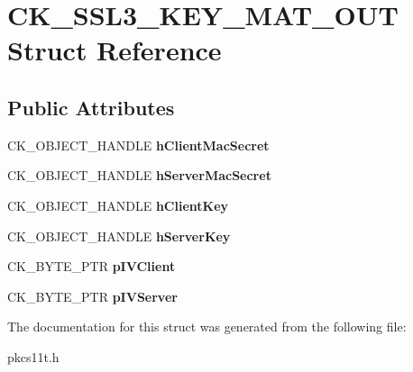 \hypertarget{struct_c_k___s_s_l3___k_e_y___m_a_t___o_u_t}{}\section{C\+K\+\_\+\+S\+S\+L3\+\_\+\+K\+E\+Y\+\_\+\+M\+A\+T\+\_\+\+O\+UT Struct Reference}
\label{struct_c_k___s_s_l3___k_e_y___m_a_t___o_u_t}
\subsection*{Public Attributes}
\begin{DoxyCompactItemize}
\item 
\mbox{\label{struct_c_k___s_s_l3___k_e_y___m_a_t___o_u_t_a9ab1eebd1213b9a4e0edd87c0543b26c}} 
C\+K\+\_\+\+O\+B\+J\+E\+C\+T\+\_\+\+H\+A\+N\+D\+LE {\bfseries h\+Client\+Mac\+Secret}
\item 
\mbox{\label{struct_c_k___s_s_l3___k_e_y___m_a_t___o_u_t_a5de25eb03ea61a0a25054d5aeacd682f}} 
C\+K\+\_\+\+O\+B\+J\+E\+C\+T\+\_\+\+H\+A\+N\+D\+LE {\bfseries h\+Server\+Mac\+Secret}
\item 
\mbox{\label{struct_c_k___s_s_l3___k_e_y___m_a_t___o_u_t_aa01518b6ad293460acad4ba95886c622}} 
C\+K\+\_\+\+O\+B\+J\+E\+C\+T\+\_\+\+H\+A\+N\+D\+LE {\bfseries h\+Client\+Key}
\item 
\mbox{\label{struct_c_k___s_s_l3___k_e_y___m_a_t___o_u_t_a3a1912610629182d4fe1a27f18602f04}} 
C\+K\+\_\+\+O\+B\+J\+E\+C\+T\+\_\+\+H\+A\+N\+D\+LE {\bfseries h\+Server\+Key}
\item 
\mbox{\label{struct_c_k___s_s_l3___k_e_y___m_a_t___o_u_t_a21259dbabcc7588455addfbddc207312}} 
C\+K\+\_\+\+B\+Y\+T\+E\+\_\+\+P\+TR {\bfseries p\+I\+V\+Client}
\item 
\mbox{\label{struct_c_k___s_s_l3___k_e_y___m_a_t___o_u_t_aab8e3a04c7ababeaf39ae5692a6c4178}} 
C\+K\+\_\+\+B\+Y\+T\+E\+\_\+\+P\+TR {\bfseries p\+I\+V\+Server}
\end{DoxyCompactItemize}


The documentation for this struct was generated from the following file\+:\begin{DoxyCompactItemize}
\item 
pkcs11t.\+h\end{DoxyCompactItemize}
